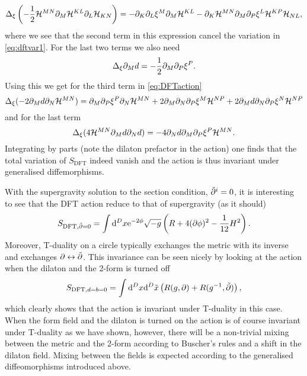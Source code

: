 \begin{equation}
    \Delta_\xi \left(-\frac{1}{2}\mathcal{H}^{MN}\partial_M\mathcal{H}^{KL}\partial_L\mathcal{H}_{KN}\right) = -\partial_K\partial_L\xi^M\partial_M\mathcal{H}^{KL}-\partial_K\mathcal{H}^{MN}\partial_M\partial_P\xi^L\mathcal{H}^{KP}\mathcal{H}_{NL},
\end{equation}
where we see that the second term in this expression cancel the variation in \eqref{eq:dftvar1}. For the last two terms we also need
\begin{equation}
    \Delta_\xi \partial_M d = -\frac{1}{2}\partial_M\partial_P\xi^P.
\end{equation}
Using this we get for the third term in \eqref{eq:DFTaction}
\begin{equation}
    \Delta_\xi (-2\partial_Md\partial_N\mathcal{H}^{MN}) = \partial_M\partial_P\xi^P\partial_N\mathcal{H}^{MN}+2\partial_M\partial_N\partial_P\xi^M\mathcal{H}^{NP}+2\partial_M d\partial_N\partial_P\xi^N\mathcal{H}^{NP}
\end{equation}
and for the last term
\begin{equation}
    \Delta_\xi (4\mathcal{H}^{MN}\partial_Md\partial_Nd) = -4\partial_N d\partial_M\partial_P\xi^P\mathcal{H}^{MN}.
\end{equation}
Integrating by parts (note the dilaton prefactor in the action) one finds that the total variation of $S_{\text{DFT}}$ indeed vanish and the action is thus invariant under generalised diffemorphisms. 


With the supergravity solution to the section condition, $\tilde{\partial}^i = 0$, it is interesting to see that the DFT action reduce to that of supergravity (as it should)
\begin{equation}
    S_{\text{DFT},\tilde{\partial}=0} = \int\mathrm{d}^Dx \mathrm{e}^{-2\phi}\sqrt{-g}\left(R+4(\partial\phi)^2-\frac{1}{12}H^2\right).
\end{equation}
Moreover, T-duality on a circle typically exchanges the metric with its inverse and exchanges $\partial\leftrightarrow\tilde{\partial}$. This invariance can be seen nicely by looking at the action when the dilaton and the 2-form is turned off 
\begin{equation}
    S_{\text{DFT},d=b=0} = \int\mathrm{d}^Dx\mathrm{d}^D\tilde{x}\left(R(g,\partial)+R(g^{-1},\tilde{\partial})\right),
\end{equation}
which clearly shows that the action is invariant under T-duality in this case. When the form field and the dilaton is turned on the action is of course invariant under T-duality as we have shown, however, there will be a non-trivial mixing between the metric and the 2-form according to Buscher's rules \cite{Blumenhagen2013} and a shift in the dilaton field. Mixing between the fields is expected according to the generalised diffeomorphisms introduced above. 



